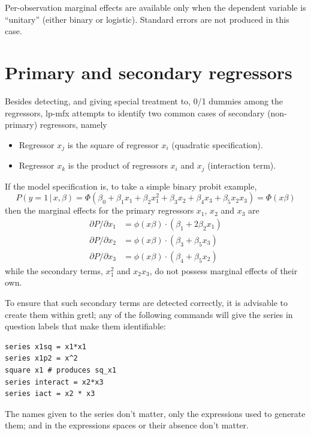 \documentclass{article}
\begin{document}
Per-observation marginal effects are available only when the dependent
variable is ``unitary'' (either binary or logistic). Standard errors
are not produced in this case.

\section{Primary and secondary regressors}

Besides detecting, and giving special treatment to, 0/1 dummies among
the regressors, \textsf{lp-mfx} attempts to identify two common cases
of secondary (non-primary) regressors, namely
\begin{itemize}
\item Regressor $x_j$ is the square of regressor $x_i$ (quadratic
  specification).
\item Regressor $x_k$ is the product of regressors $x_i$ and $x_j$
  (interaction term).
\end{itemize}
If the model specification is, to take a simple binary probit example,
\[
  P(y=1\, |\, x, \beta) = \Phi(\beta_0 + \beta_1 x_1 + \beta_2 x_1^2 +
  \beta_3 x_2 + \beta_4 x_3 + \beta_5 x_2 x_3) = \Phi(x\beta)
\]
then the marginal effects for the primary regressors $x_1$, $x_2$ and
$x_3$ are
\begin{align*}
  \partial  P/\partial x_1 &=\phi(x\beta)\cdot (\beta_1 + 2 \beta_2x_1) \\
  \partial  P/\partial x_2 &=\phi(x\beta)\cdot (\beta_3 + \beta_5x_3) \\
  \partial  P/\partial x_3 &=\phi(x\beta)\cdot (\beta_4 + \beta_5x_2)
\end{align*}
while the secondary terms, $x_1^2$ and $x_2 x_3$, do not possess
marginal effects of their own.

To ensure that such secondary terms are detected correctly, it is
advisable to create them within gretl; any of the following
commands will give the series in question labels that make them
identifiable:
\begin{verbatim}
series x1sq = x1*x1
series x1p2 = x^2
square x1 # produces sq_x1
series interact = x2*x3
series iact = x2 * x3
\end{verbatim}
The names given to the series don't matter, only the expressions used
to generate them; and in the expressions spaces or their absence don't
matter.
\end{document}
